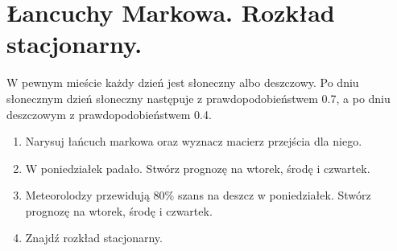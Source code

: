 \documentclass[12pt]{article}
\begin{document}
    \section{Łancuchy Markowa. Rozkład stacjonarny.}
    \begin{exercise}
        W pewnym mieście każdy dzień jest słoneczny albo deszczowy. Po dniu słonecznym dzień słoneczny
        następuje z prawdopodobieństwem 0.7, a po dniu deszczowym z prawdopodobieństwem 0.4.
        \begin{enumerate}
            \item Narysuj łańcuch markowa oraz wyznacz macierz przejścia dla niego.
            \item W poniedziałek padało. Stwórz prognozę na wtorek, środę i czwartek.
            \item Meteorolodzy przewidują 80\% szans na deszcz w poniedziałek. Stwórz prognozę na wtorek, środę i czwartek.
            \item Znajdź rozkład stacjonarny.
        \end{enumerate}
    \end{exercise}
\end{document}
